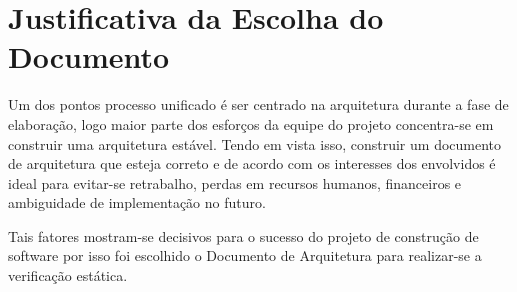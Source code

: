 \chapter{Justificativa da Escolha do Documento}

Um dos pontos processo unificado é ser centrado na arquitetura durante a fase de elaboração, logo maior parte dos esforços da equipe do projeto concentra-se em construir uma arquitetura estável. 
Tendo em vista isso, construir um documento de arquitetura que esteja correto  e de acordo com os interesses dos envolvidos é ideal para evitar-se retrabalho, perdas em recursos humanos, financeiros e ambiguidade de implementação no futuro. 

Tais fatores mostram-se decisivos para o sucesso do projeto de construção de software por isso foi escolhido o Documento de Arquitetura para realizar-se a verificação estática. 
